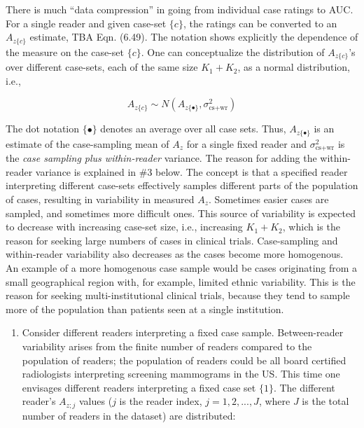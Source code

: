 \documentclass[
]{book}
\providecommand{\tightlist}{%
  \setlength{\itemsep}{0pt}\setlength{\parskip}{0pt}}
\begin{document}
There is much ``data compression'' in going from individual case ratings to AUC. For a single reader and given case-set \(\{c\}\), the ratings can be converted to an \(A_{z\{c\}}\) estimate, TBA Eqn. (6.49). The notation shows explicitly the dependence of the measure on the case-set \(\{c\}\). One can conceptualize the distribution of \(A_{z\{c\}}\)'s over different case-sets, each of the same size \(K_1+K_2\), as a normal distribution, i.e.,

\begin{equation} 
A_{z\{c\}}\sim N(A_{z\{\bullet\}},\sigma_{\text{cs+wr}}^2)
\label{eq:sources-of-variability-cs-wr}
\end{equation}

The dot notation \(\{\bullet\}\) denotes an average over all case sets. Thus, \(A_{z\{\bullet\}}\) is an estimate of the case-sampling mean of \(A_z\) for a single fixed reader and \(\sigma_{\text{cs+wr}}^2\) is the \emph{case sampling plus within-reader} variance. The reason for adding the within-reader variance is explained in \#3 below. The concept is that a specified reader interpreting different case-sets effectively samples different parts of the population of cases, resulting in variability in measured \(A_z\). Sometimes easier cases are sampled, and sometimes more difficult ones. This source of variability is expected to decrease with increasing case-set size, i.e., increasing \(K_1+K_2\), which is the reason for seeking large numbers of cases in clinical trials. Case-sampling and within-reader variability also decreases as the cases become more homogenous. An example of a more homogenous case sample would be cases originating from a small geographical region with, for example, limited ethnic variability. This is the reason for seeking multi-institutional clinical trials, because they tend to sample more of the population than patients seen at a single institution.

\begin{enumerate}
\def\labelenumi{\arabic{enumi}.}
\setcounter{enumi}{1}
\tightlist
\item
  Consider different readers interpreting a fixed case sample. Between-reader variability arises from the finite number of readers compared to the population of readers; the population of readers could be all board certified radiologists interpreting screening mammograms in the US. This time one envisages different readers interpreting a fixed case set \(\{1\}\). The different reader's \(A_{z;j}\) values (\(j\) is the reader index, \(j = 1, 2, ..., J\), where \(J\) is the total number of readers in the dataset) are distributed:
\end{enumerate}
\end{document}

